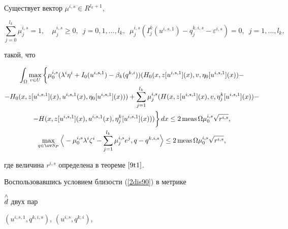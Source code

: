 \begin{thms}\label{9t1_1}


Существует вектор $\mu^{i,s}\in R^{l_k+1}$,


$$


\sum_{j=0}^{l_k}\mu_j^{i,s}=1,\quad \mu^{i,s}_j\geq 0,\ \;


j=0,1,\dotsc,l_k,


\ \; \mu^{i,s}_j(I_j^k(u^{i,s,1})-q_j^{k,i,s}-\varepsilon^{i,s})=0,\ \;


j=1,\dotsc,l_k,


$$


такой, что


\begin{gather*}


\int_\Omega\max_{v\in U}


\bigg\{\mu^{i,s}_0(\lambda^i\eta^i+I_0(u^{i,s,1})-


\beta_k(q^{k,i}))(H_0(x,z[u^{i,s,1}](x),v,\eta_0[u^{i,s,1}](x))- \\


%


- H_0(x,z[u^{i,s,1}](x),u^{i,s,1}(x),\eta_0[u^{i,s,1}](x)))+


\sum_{j=1}^{l_k}\mu^{i,s}_j(H(x,z[u^{i,s,1}](x),v,\eta_j^k[u^{i,s,1}](x))- \\


%


-H(x,z[u^{i,s,1}](x),u^{i,s,1}(x),\eta_j^k[u^{i,s,1}](x)))\bigg\}\,dx


\leq 2\meas\Omega\mu^{i,s}_0\sqrt{r^{i,s}}, \\


%


\max_{q\in\ov S_P}\Big\langle -\mu^{i,s}_0\lambda^i\zeta^i-


\sum_{j=1}^{l_k}\mu^{i,s}_je^j,q-q^{k,i,s}\Big\rangle\leq


2\meas\Omega\mu^{i,s}_0\sqrt{r^{i,s}},


\end{gather*}


где величина $r^{i,s}$ определена в теореме $\ref{9t1}$.


\end{thms}





Воспользовавшись условием близости (\ref{2dis90}) в метрике


$\overset{\wedge}{d}{}$ двух пар


$(u^{i,s,1},q^{k,i,s})$, $(u^{i,s},q^{k,i})$,


